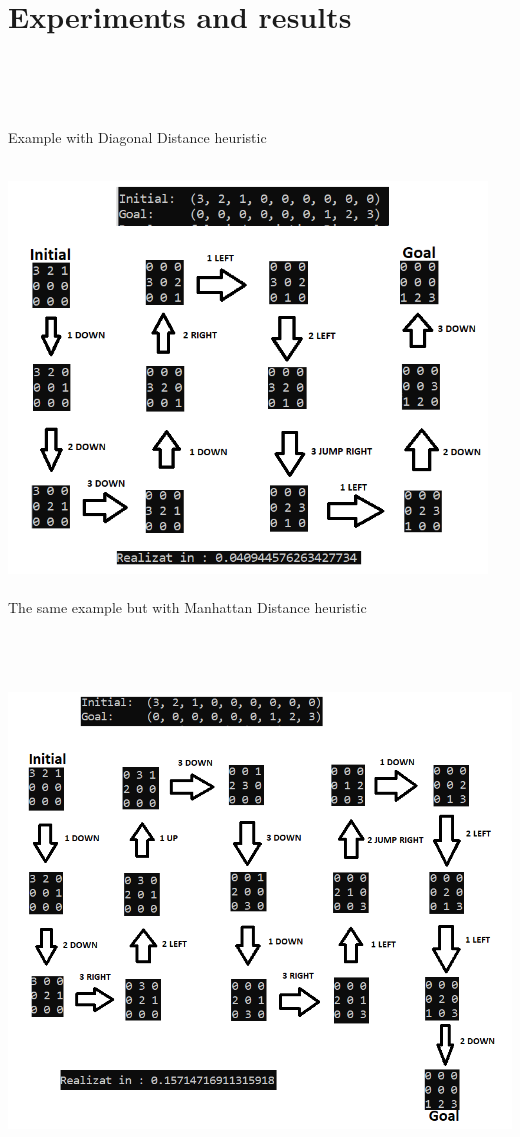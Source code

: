\documentclass[14pt]{article}
\begin{document}
\section*{Experiments and results}
\\\\\\
\begin{center}
Example with Diagonal Distance heuristic
\vspace{10mm}

\includegraphics[height=4.5in, width = 5in]{example1.png}\\
\newpage
The same example but with Manhattan Distance heuristic  \\
\includegraphics[height=6.1in, width = 6in]{example2.png}\\

\end{center}
\end{document}
